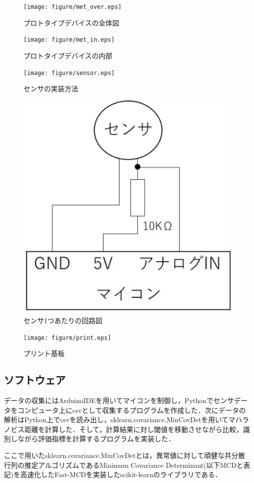 \documentclass[Japanese,noauthor]{dicomopapers}
\begin{document}
\begin{figure}[!t]
  \begin{center}
    \texttt{[image: figure/met\_over.eps]}
  \end{center}
  \caption{プロトタイプデバイスの全体図}
  \label{met_over}
\end{figure}

\begin{figure}[!t]
  \begin{center}
    \texttt{[image: figure/met\_in.eps]}
  \end{center}
  \caption{プロトタイプデバイスの内部}
  \label{met_in}
\end{figure}

\begin{figure}[!t]
  \begin{center}
    \texttt{[image: figure/sensor.eps]}
  \end{center}
  \caption{センサの実装方法}
  \label{sensor}
\end{figure}

\begin{figure}[!t]
  \begin{center}
    \includegraphics[width=0.5\linewidth]{figure/circuit.eps}
  \end{center}
  \caption{センサ1つあたりの回路図}
  \label{circuit}
\end{figure}

\begin{figure}[!t]
  \begin{center}
    \texttt{[image: figure/print.eps]}
  \end{center}
  \caption{プリント基板}
  \label{print}
\end{figure}

\subsection{ソフトウェア}
データの収集にはArduinoIDEを用いてマイコンを制御し，Pythonでセンサデータをコンピュータ上にcsvとして収集するプログラムを作成した．次にデータの解析はPython上でcsvを読み出し，sklearn.covariance.MinCovDetを用いてマハラノビス距離を計算した．そして，計算結果に対し閾値を移動させながら比較，識別しながら評価指標を計算するプログラムを実装した．\par
ここで用いたsklearn.covariance.MinCovDetとは，異常値に対して頑健な共分散行列の推定アルゴリズムであるMinimum Covariance Determinant(以下MCDと表記)を高速化したFast-MCD\cite{fast_mcd}を実装したscikit-learnのライブラリである．
\end{document}
